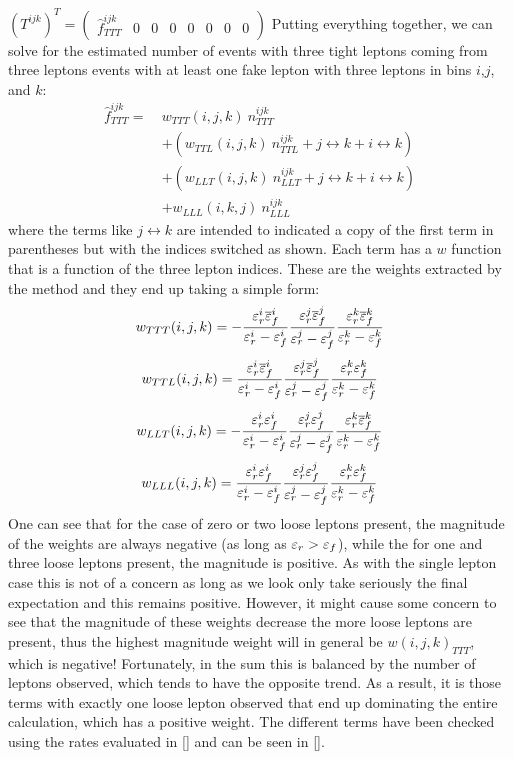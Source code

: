 $(T^{ijk})^T=\begin{pmatrix} 
  \hat{f}_{TTT}^{ijk}& 0 & 0 & 0 & 0 & 0 & 0 & 0 
  \end{pmatrix}$
Putting everything together, we can solve for the estimated
number of events with three tight leptons 
coming from three leptons events with at least one fake lepton
with three leptons in bins $i$,$j$, and $k$:
\begin{align*}
\hat{f}^{ijk}_{TTT} = ~& w_{TTT}(i,j,k)~n^{ijk}_{TTT}  \\
   &+(w_{TTL}(i,j,k)~n^{ijk}_{TTL} + j\leftrightarrow k + i \leftrightarrow k)\\
   &+(w_{LLT}(i,j,k)~n^{ijk}_{LLT} + j\leftrightarrow k + i \leftrightarrow k) \\
   &+w_{LLL}(i,k,j)~n^{ijk}_{LLL}
\end{align*}
where the terms like $j\leftrightarrow k$ are intended to indicated
a copy of the first term in parentheses but with the indices 
switched as shown. Each term has a $w$ function that is a function
of the three lepton indices. These are the weights
extracted by the method and they end up taking a simple form:
\begin{equation}
w_{TTT}(i,j,k) = 
-\frac{\varepsilon_r^i\overline{\varepsilon}_f^i}{\varepsilon_r^i-\varepsilon_f^i}
\frac{\varepsilon_r^j\overline{\varepsilon}_f^j}{\varepsilon_r^j-\varepsilon_f^j}
\frac{\varepsilon_r^k\overline{\varepsilon}_f^k}{\varepsilon_r^k-\varepsilon_f^k}
\end{equation}
\begin{equation}
w_{TTL}(i,j,k) = 
\frac{\varepsilon_r^i\overline{\varepsilon}_f^i}{\varepsilon_r^i-\varepsilon_f^i}
\frac{\varepsilon_r^j\overline{\varepsilon}_f^j}{\varepsilon_r^j-\varepsilon_f^j}
\frac{\varepsilon_r^k\varepsilon_f^k}{\varepsilon_r^k-\varepsilon_f^k}
\end{equation}
\begin{equation}
w_{LLT}(i,j,k) =  
- \frac{\varepsilon_r^i\varepsilon_f^i}{\varepsilon_r^i-\varepsilon_f^i}
\frac{\varepsilon_r^j\varepsilon_f^j}{\varepsilon_r^j-\varepsilon_f^j}
\frac{\varepsilon_r^k\overline{\varepsilon}_f^k}{\varepsilon_r^k-\varepsilon_f^k}
\end{equation}
\begin{equation}
w_{LLL}(i,j,k) =  
\frac{\varepsilon_r^i\varepsilon_f^i}{\varepsilon_r^i-\varepsilon_f^i}
\frac{\varepsilon_r^j\varepsilon_f^j}{\varepsilon_r^j-\varepsilon_f^j}
\frac{\varepsilon_r^k\varepsilon_f^k}{\varepsilon_r^k-\varepsilon_f^k}
\end{equation}
One can see that for the case of zero or two loose leptons present, 
the magnitude of the weights are always negative (as long
as $\varepsilon_r > \varepsilon_f$), while the for one and three loose leptons 
present, the magnitude is positive. As with the single
lepton case this is not of a concern as long as we look only 
take seriously the final expectation and this remains positive.
However, it might cause some concern to see that 
the magnitude of these weights decrease the more loose leptons 
are present, thus the highest magnitude weight
will in general be $w(i,j,k)_{TTT}$, which is negative!
Fortunately, in the sum this is balanced by the number of 
leptons observed, which tends to have the opposite trend.
As a result, it is those terms with exactly one loose lepton
observed that end up dominating the entire calculation, which
has a positive weight. The different terms have been 
checked using the rates evaluated in \sec\ref{}
and can be seen in \fig\ref{}.



